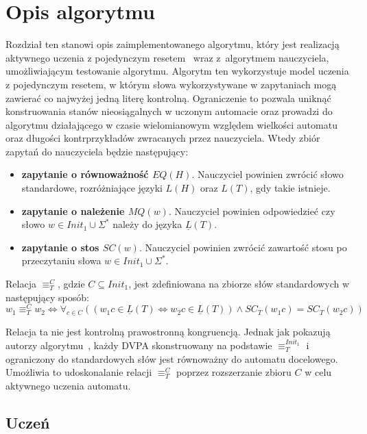 \chapter{Opis algorytmu}

Rozdział ten stanowi opis zaimplementowanego algorytmu, który jest realizacją aktywnego uczenia z pojedynczym
resetem~\cite[6. Learning with a single reset]{main} wraz z~algorytmem nauczyciela, umożliwiającym testowanie algorytmu.
Algorytm ten wykorzystuje model uczenia z pojedynczym resetem, w którym słowa wykorzystywane w zapytaniach mogą zawierać
co najwyżej jedną literę kontrolną. Ograniczenie to pozwala uniknąć konstruowania stanów nieosiągalnych w uczonym automacie
oraz prowadzi do algorytmu działającego w czasie wielomianowym względem wielkości automatu oraz długości kontrprzykładów
zwracanych przez nauczyciela. Wtedy zbiór zapytań do nauczyciela będzie następujący:

\begin{itemize}
    \item \textbf{zapytanie o równoważność $EQ(H)$}. Nauczyciel powinien zwrócić słowo standardowe, rozróżniające języki $L(H)$ oraz $L(T)$, gdy takie istnieje.
    \item \textbf{zapytanie o należenie $MQ(w)$}. Nauczyciel powinien odpowiedzieć czy słowo $w \in Init_1 \cup \Sigma^*$ należy do języka $\underline{L}(T)$.
    \item \textbf{zapytanie o stos $SC(w)$}. Nauczyciel powinien zwrócić zawartość stosu po przeczytaniu słowa $w \in Init_1 \cup \Sigma^*$.
\end{itemize}

Relacja $\equiv^{C}_T$, gdzie $C \subseteq Init_1$, jest zdefiniowana na zbiorze słów standardowych w następujący sposób:
$$w_1 \equiv^{C}_T w_2 \Leftrightarrow \forall_{c \in C}((w_1c \in \underline{L}(T) \Leftrightarrow w_2c \in \underline{L}(T)) \land SC_T(w_1c) = SC_T(w_2c))$$

Relacja ta nie jest kontrolną prawostronną kongruencją. Jednak jak pokazują autorzy algorytmu~\cite[Lemma 6]{main}, każdy DVPA skonstruowany
na podstawie $\equiv^{Init_1}_T$ i ograniczony do standardowych słów jest równoważny do automatu docelowego. Umożliwia to udoskonalanie
relacji $\equiv^{C}_T$ poprzez rozszerzanie zbioru $C$ w celu aktywnego uczenia automatu.


\section{Uczeń}

